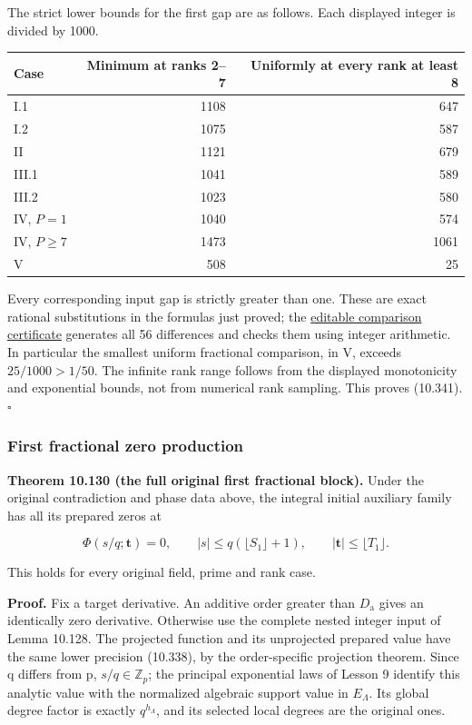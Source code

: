 \documentclass[
  11pt,
  a4paper,
]{article}
\newcounter{none} %
\begin{document}
The strict lower bounds for the first gap are as follows. Each displayed
integer is divided by 1000.

{\def\LTcaptype{none} %
\begin{longtable}[]{@{}lrr@{}}
\toprule\noalign{}
Case & Minimum at ranks 2--7 & Uniformly at every rank at least 8 \\
\midrule\noalign{}
\endhead
\bottomrule\noalign{}
\endlastfoot
I.1 & 1108 & 647 \\
I.2 & 1075 & 587 \\
II & 1121 & 679 \\
III.1 & 1041 & 589 \\
III.2 & 1023 & 580 \\
IV, \(P=1\) & 1040 & 574 \\
IV, \(P\ge7\) & 1473 & 1061 \\
V & 508 & 25 \\
\end{longtable}
}

Every corresponding input gap is strictly greater than one. These are
exact rational substitutions in the formulas just proved; the
\href{../figure_sources/first_fractional_bounds.py}{editable comparison
certificate} generates all 56 differences and checks them using integer
arithmetic. In particular the smallest uniform fractional comparison, in
V, exceeds \(25/1000>1/50\). The infinite rank range follows from the
displayed monotonicity and exponential bounds, not from numerical rank
sampling. This proves (10.341). \(\square\)

\subsubsection{First fractional zero
production}\label{first-fractional-zero-production}

\textbf{Theorem 10.130 (the full original first fractional block).}
Under the original contradiction and phase data above, the integral
initial auxiliary family has all its prepared zeros at

\[
\Phi(s/q;\boldsymbol t)=0,
\qquad |s|\le q(\lfloor S_1\rfloor+1),\qquad
|\boldsymbol t|\le\lfloor T_1\rfloor.
\tag{10.343}
\]

This holds for every original field, prime and rank case.

\textbf{Proof.} Fix a target derivative. An additive order greater than
\(D_{\mathrm a}\) gives an identically zero derivative. Otherwise use
the complete nested integer input of Lemma 10.128. The projected
function and its unprojected prepared value have the same lower
precision (10.338), by the order-specific projection theorem. Since q
differs from p, \(s/q\in\mathbb Z_p\); the principal exponential laws of
Lesson 9 identify this analytic value with the normalized algebraic
support value in \(E_\Lambda\). Its global degree factor is exactly
\(q^{h_\Lambda}\), and its selected local degrees are the original ones.
\end{document}
